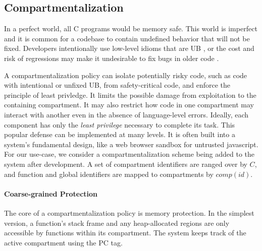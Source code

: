 \documentclass{llncs}
\begin{document}
\subsection{Compartmentalization}
\label{sec:comp}
In a perfect world, all C programs would be memory safe. This world is imperfect and it is common
for a codebase to contain undefined behavior that will not be fixed. Developers intentionally use 
low-level idioms that are UB \cite{Memarian16:DeFacto}, or the cost and risk of regressions may make it
undesirable to fix bugs in older code \cite{Bessey10:Coverity}.

A compartmentalization policy can isolate potentially risky code, such as code with intentional
or unfixed UB, from safety-critical code, and enforce the principle of least privledge. 
It limits the possible damage from exploitation to the containing compartment.
It may also restrict how code in one compartment may interact with another
even in the absence of language-level errors. Ideally, each component has only the
{\em least privilege} necessary to complete its task.
This popular defense can be implemented at many levels. It is often built
into a system's fundamental design, like a web browser sandbox for untrusted javascript.
For our use-case, we consider a compartmentalization scheme being added to the system
after development. A set of compartment identifiers are ranged over by \(C\),
and function and global identifiers are mapped to compartments by \(\mathit{comp}(id)\). 

\paragraph{Coarse-grained Protection}

%
The core of a compartmentalization policy is memory protection. In the simplest version, 
a function's stack frame and any heap-allocated regions are only accessible by functions within its
compartment. The system keeps track of the active compartment using the PC tag.
\end{document}
